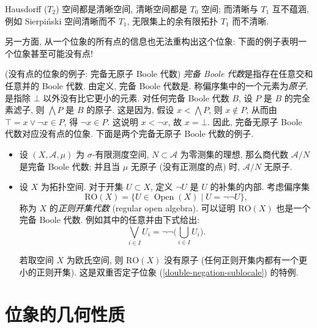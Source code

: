 \begin{prop}
	{}
	Hausdorff ($T_2$) 空间都是清晰空间, 清晰空间都是 $T_0$ 空间; 而清晰与 $T_1$ 互不蕴涵, 例如 Sierpi\'nski 空间清晰而不 $T_1$, 无限集上的余有限拓扑 $T_1$ 而不清晰.
\end{prop}

另一方面, 从一个位象的所有点的信息也无法重构出这个位象: 下面的例子表明一个位象甚至可能没有点!

\begin{example}
	[label={complete-atomless-Boolean-algebra}]
	{(没有点的位象的例子: 完备无原子 Boole 代数)}
	\emph{完备 Boole 代数}是指存在任意交和任意并的 Boole 代数.
	由定义, 完备 Boole 代数是\fm.
	称偏序集中的一个元素为\emph{原子}, 是指除 $\bot$ 以外没有比它更小的元素.
	对任何完备 Boole 代数 $B$, 设 $P$ 是 $B$ 的完全素滤子,
	则 $\bigwedge P$ 是 $B$ 的原子. 这是因为, 假设 $x < \bigwedge P$,
	则 $x\notin P$, 从而由 $\top=x\vee\neg x\in P$, 得 $\neg x \in P$. 这说明 $x<\neg x$, 故 $x=\bot$.
	因此, 完备无原子 Boole 代数对应没有点的位象.
	下面是两个完备无原子 Boole 代数的例子.
	
	\begin{itemize}
		\item 设 $(X,\mathcal A,\mu)$ 为 $\sigma$-有限测度空间, $N\subset \mathcal A$ 为零测集的理想,
		那么商代数 $\mathcal A / N$ 是完备 Boole 代数; 并且当 $\mu$ 无原子 (没有正测度的点) 时, $\mathcal A/N$ 无原子.
		\item	
	设 $X$ 为拓扑空间. 对于开集 $U\subset X$, 定义 $\neg U$ 是 $U$ 的补集的内部.
	考虑偏序集
	$$
	\text{RO}(X)
	=
	\big\{U\in\operatorname{Open}(X)\mid U = \neg\neg U\big\},
	$$
	称为 $X$ 的\emph{正则开集代数} (regular open algebra). 可以证明 $\text{RO}(X)$ 也是一个完备 Boole 代数\footnotemark. 例如其中的任意并由下式给出:
	$$
	\bigvee_{i\in I}U_i = \neg\neg\Big(\bigcup_{i\in I}U_i\Big).
	$$
	
	若取空间 $X$ 为欧氏空间, 则 $\text{RO}(X)$ 没有原子 (任何正则开集内都有一个更小的正则开集). 这是双重否定子位象 (\ref{double-negation-sublocale}) 的特例.
	\end{itemize}
\end{example}

\section{位象的几何性质}

